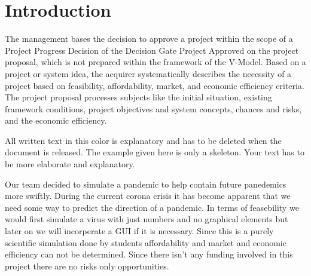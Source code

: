\documentclass[12pt]{article}
\theoremstyle{definition}
\newenvironment{explanation}{%
   \setlength{\parindent}{0pt}
   \itshape
   \color{blue}
}{}
\begin{document}
\section{Introduction}
\begin{explanation}
The management bases the decision to approve a project within the scope of a Project Progress Decision of the Decision Gate Project Approved on the project proposal, which is not prepared within the framework of the V-Model. Based on a project or system idea, the acquirer systematically describes the necessity of a project based on feasibility, affordability, market, and economic efficiency criteria.
The project proposal processes subjects like the initial situation, existing framework conditions, project objectives and system concepts, chances and risks, and the economic efficiency.

All written text in this color is explanatory and has to be deleted when the document is released. The example given here is only a skeleton. Your text has to be more elaborate and explanatory.
\end{explanation}

\vspace{2em}

Our team decided to simulate a pandemic to help contain future panedemics more swiftly.
During the current corona crisis it has become apparent that we need some way to predict the direction of a pandemic.
In terms of feasebility we would first simulate a virus with just numbers and no graphical elements but later on we will incorperate a GUI if it is necessary.
Since this is a purely scientific simulation done by students affordability and market and economic efficiency can not be determined.
Since there isn't any funding involved in this project there are no risks only opportunities.


\pagebreak
\end{document}
